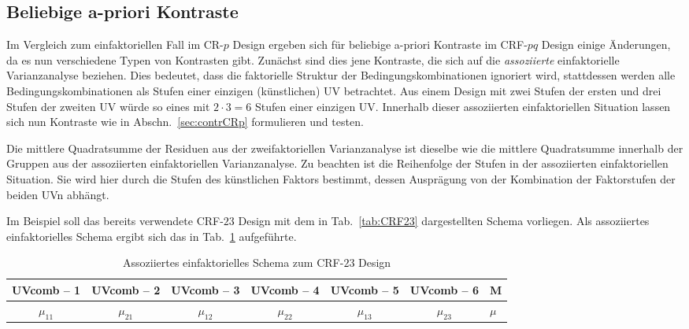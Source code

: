 \subsection{Beliebige a-priori Kontraste}
\label{sec:contrCRFpq}

Im Vergleich zum einfaktoriellen Fall im CR-$p$ Design ergeben sich für beliebige a-priori Kontraste im CRF-$pq$ Design einige Änderungen, da es nun verschiedene Typen von Kontrasten gibt. Zunächst sind dies jene Kontraste, die sich auf die \emph{assoziierte} einfaktorielle Varianzanalyse beziehen. Dies bedeutet, dass die faktorielle Struktur der Bedingungskombinationen ignoriert wird, stattdessen werden alle Bedingungskombinationen als Stufen einer einzigen (künstlichen) UV betrachtet. Aus einem Design mit zwei Stufen der ersten und drei Stufen der zweiten UV würde so eines mit $2 \cdot 3=6$ Stufen einer einzigen UV\@. Innerhalb dieser assoziierten einfaktoriellen Situation lassen sich nun Kontraste wie in Abschn.\ \ref{sec:contrCRp} formulieren und testen.

Die mittlere Quadratsumme der Residuen aus der zweifaktoriellen Varianzanalyse ist dieselbe wie die mittlere Quadratsumme innerhalb der Gruppen aus der assoziierten einfaktoriellen Varianzanalyse. Zu beachten ist die Reihenfolge der Stufen in der assoziierten einfaktoriellen Situation. Sie wird hier durch die Stufen des künstlichen Faktors bestimmt, dessen Ausprägung von der Kombination der Faktorstufen der beiden UVn abhängt.

Im Beispiel soll das bereits verwendete CRF-$23$ Design mit dem in Tab.\ \ref{tab:CRF23} dargestellten Schema vorliegen. Als assoziiertes einfaktorielles Schema ergibt sich das in Tab.\ \ref{tab:CRF23assoc} aufgeführte.

\begin{table}[ht]
\centering
\caption{Assoziiertes einfaktorielles Schema zum CRF-$23$ Design}
\label{tab:CRF23assoc}
\begin{tabular}{ccccccl}
\hline
\sffamily UVcomb -- 1 & \sffamily UVcomb -- 2 & \sffamily UVcomb -- 3 & \sffamily UVcomb -- 4 & \sffamily UVcomb -- 5 & \sffamily UVcomb -- 6 & \sffamily M\\\hline\hline
$\mu_{11}$ & $\mu_{21}$ & $\mu_{12}$ & $\mu_{22}$ & $\mu_{13}$ & $\mu_{23}$ & $\mu$\\\hline
\end{tabular}
\end{table}

